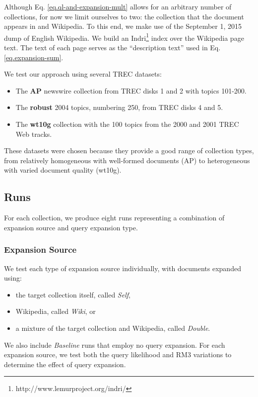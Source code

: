 \documentclass{sig-alternate}
\begin{document}
Although Eq. \ref{eq.ql-and-expansion-mult} allows for an arbitrary number of collections, for now we limit ourselves to two: the collection that the document appears in and Wikipedia. To this end, we make use of the September 1, 2015 dump of English Wikipedia. We build an Indri\footnote{http://www.lemurproject.org/indri/} index over the Wikipedia page text. The text of each page serves as the ``description text'' used in Eq. \ref{eq.expansion-sum}.

We test our approach using several TREC datasets:
\begin{itemize}
	\item The \textbf{AP} newswire collection from TREC disks 1 and 2 with topics 101-200.
	\item The \textbf{robust} 2004 topics, numbering 250, from TREC disks 4 and 5.
	\item The \textbf{wt10g} collection with the 100 topics from the 2000 and 2001 TREC Web tracks.
\end{itemize}

These datasets were chosen because they provide a good range of collection types, from relatively homogeneous with well-formed documents (AP) to heterogeneous with varied document quality (wt10g).

\subsection{Runs}\label{section.evaluation.runs}

For each collection, we produce eight runs representing a combination of expansion source and query expansion type.

\subsubsection{Expansion Source}\label{section.evaluation.runs.expansion}

We test each type of expansion source individually, with documents expanded using:
\begin{itemize}
	\item the target collection itself, called \textit{Self},
	\item Wikipedia, called \textit{Wiki}, or
	\item a mixture of the target collection and Wikipedia, called \textit{Double}.
\end{itemize}

We also include \textit{Baseline} runs that employ no query expansion. For each expansion source, we test both the query likelihood and RM3 variations to determine the effect of query expansion.
\end{document}
